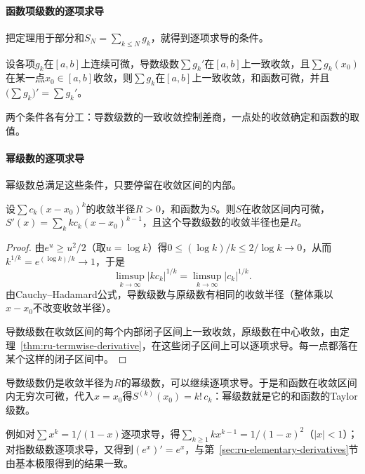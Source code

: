 \paragraph{函数项级数的逐项求导}
把定理用于部分和$S_N=\sum_{k\leq N}g_k$，就得到逐项求导的条件。
\begin{theorem}[逐项求导]
\label{thm:ru-termwise-derivative}
设各项$g_k$在$[a,b]$上连续可微，导数级数$\sum g_k'$在$[a,b]$上一致收敛，且$\sum g_k(x_0)$在某一点$x_0\in[a,b]$收敛，则$\sum g_k$在$[a,b]$上一致收敛，和函数可微，并且$\bigl(\sum g_k\bigr)'=\sum g_k'$。
\end{theorem}
两个条件各有分工：导数级数的一致收敛控制差商，一点处的收敛确定和函数的取值。

\paragraph{幂级数的逐项求导}
幂级数总满足这些条件，只要停留在收敛区间的内部。
\begin{theorem}[幂级数的逐项求导]
\label{thm:ru-power-series-derivative}
设$\sum c_k(x-x_0)^k$的收敛半径$R>0$，和函数为$S$。则$S$在收敛区间内可微，$S'(x)=\sum_kkc_k(x-x_0)^{k-1}$，且这个导数级数的收敛半径也是$R$。
\end{theorem}
\begin{proof}
由$e^u\geq u^2/2$（取$u=\log k$）得$0\leq(\log k)/k\leq2/\log k\to0$，从而$k^{1/k}=e^{(\log k)/k}\to1$，于是
\[
 \limsup_{k\to\infty}|kc_k|^{1/k}=\limsup_{k\to\infty}|c_k|^{1/k}.
\]
由Cauchy--Hadamard公式，导数级数与原级数有相同的收敛半径（整体乘以$x-x_0$不改变收敛半径）。

导数级数在收敛区间的每个内部闭子区间上一致收敛，原级数在中心收敛，由定理~\ref{thm:ru-termwise-derivative}，在这些闭子区间上可以逐项求导。每一点都落在某个这样的闭子区间中。
\end{proof}
导数级数仍是收敛半径为$R$的幂级数，可以继续逐项求导。于是和函数在收敛区间内无穷次可微，代入$x=x_0$得$S^{(k)}(x_0)=k!\,c_k$：幂级数就是它的和函数的Taylor级数。

例如对$\sum x^k=1/(1-x)$逐项求导，得$\sum_{k\geq1}kx^{k-1}=1/(1-x)^2$（$|x|<1$）；对指数级数逐项求导，又得到$(e^x)'=e^x$，与第~\ref{sec:ru-elementary-derivatives}节由基本极限得到的结果一致。

